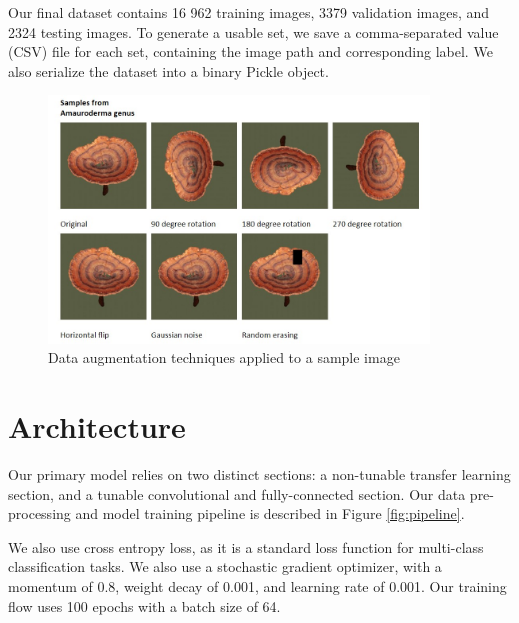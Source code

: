 \documentclass{article} %
\begin{document}
Our final dataset contains 16 962 training images, 3379 validation images, and 2324 testing images. To generate a usable set, we save a comma-separated value (CSV) file for each set, containing the image path and corresponding label. We also serialize the dataset into a binary Pickle object.

\FloatBarrier
\begin{figure}[h]
    \begin{center}
    \includegraphics[width=0.9\textwidth]{figures/data_augmentation_example.jpg}
    \end{center}
    \caption{Data augmentation techniques applied to a sample image}
    \label{fig:augmentation}
\end{figure}
\FloatBarrier

\section{Architecture}
\label{sec:architecture}
Our primary model relies on two distinct sections: a non-tunable transfer learning section, and a tunable convolutional and fully-connected section. Our data pre-processing and model training pipeline is described in Figure \ref{fig:pipeline}.

We also use cross entropy loss, as it is a standard loss function for multi-class classification tasks. We also use a stochastic gradient optimizer, with a momentum of 0.8, weight decay of 0.001, and learning rate of 0.001. Our training flow uses 100 epochs with a batch size of 64.
\end{document}
